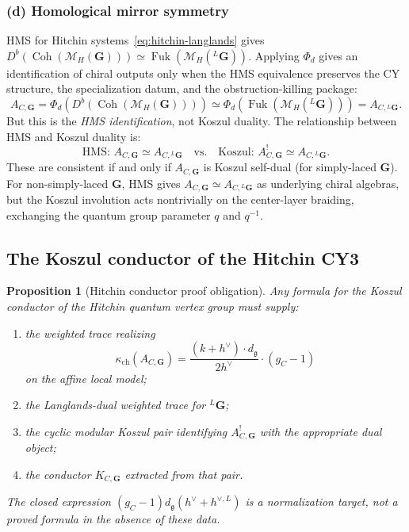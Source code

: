 \documentclass[11pt]{article}
\newtheorem{proposition}[theorem]{Proposition}
\theoremstyle{definition}
\theoremstyle{remark}
\DeclareMathOperator{\Coh}{Coh}
\DeclareMathOperator{\Fuk}{Fuk}
\newcommand{\fkg}{\mathfrak{g}}
\newcommand{\cM}{\mathcal{M}}
\begin{document}
\subsubsection{(d) Homological mirror symmetry}

HMS for Hitchin systems~\eqref{eq:hitchin-langlands} gives
$D^b(\Coh(\cM_H(\mathbf{G}))) \simeq \Fuk(\cM_H({}^L\mathbf{G}))$.
Applying $\Phi_d$ gives an identification of chiral outputs only when
the HMS equivalence preserves the CY structure, the specialization
datum, and the obstruction-killing package:
\[
A_{C,\mathbf{G}} = \Phi_d(D^b(\Coh(\cM_H(\mathbf{G}))))
\simeq \Phi_d(\Fuk(\cM_H({}^L\mathbf{G})))
= A_{C,{}^L\mathbf{G}}.
\]
But this is the \emph{HMS identification}, not Koszul duality. The
relationship between HMS and Koszul duality is:
\[
\text{HMS: } A_{C,\mathbf{G}} \simeq A_{C,{}^L\mathbf{G}}
\quad\text{vs.}\quad
\text{Koszul: } A_{C,\mathbf{G}}^! \simeq A_{C,{}^L\mathbf{G}}.
\]
These are consistent if and only if $A_{C,\mathbf{G}}$ is Koszul
self-dual (for simply-laced $\mathbf{G}$). For non-simply-laced
$\mathbf{G}$, HMS gives $A_{C,\mathbf{G}} \simeq A_{C,{}^L\mathbf{G}}$
as underlying chiral algebras, but the Koszul involution acts
nontrivially on the center-layer braiding, exchanging the quantum group
parameter $q$ and $q^{-1}$.

\subsection{The Koszul conductor of the Hitchin CY3}

\begin{proposition}[Hitchin conductor proof obligation]
\label{prop:hitchin-conductor}
Any formula for the Koszul conductor of the Hitchin quantum vertex
group must supply:
\begin{enumerate}[label=(\roman*)]
\item the weighted trace realizing
\[
\kappa_{\mathrm{ch}}(A_{C,\mathbf{G}}) =
\frac{(k + h^\vee) \cdot d_\fkg}{2 h^\vee} \cdot (g_C - 1)
\]
on the affine local model;
\item the Langlands-dual weighted trace for ${}^L\mathbf{G}$;
\item the cyclic modular Koszul pair identifying
$A_{C,\mathbf{G}}^!$ with the appropriate dual object;
\item the conductor $K_{C,\mathbf{G}}$ extracted from that pair.
\end{enumerate}
The closed expression
$(g_C - 1)d_\fkg(h^\vee+h^{\vee,L})$ is a normalization target, not a
proved formula in the absence of these data.
\end{proposition}
\end{document}
